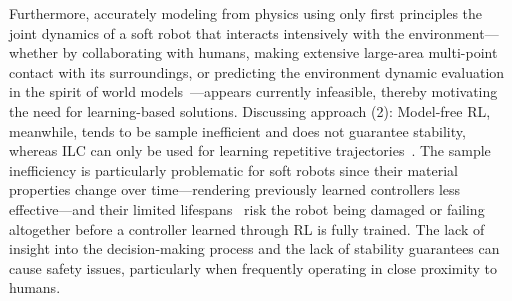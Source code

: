 Furthermore, accurately modeling from physics using only first principles the joint dynamics of a soft robot that interacts intensively with the environment—whether by collaborating with humans, making extensive large-area multi-point contact with its surroundings, or predicting the environment dynamic evaluation in the spirit of world models~\citep{ha2018world}—appears currently infeasible, thereby motivating the need for learning-based solutions.
Discussing approach (2): Model-free \gls{RL}, meanwhile, tends to be sample inefficient and does not guarantee stability, whereas \gls{ILC} can only be used for learning repetitive trajectories~\citep{bristow2006survey}. The sample inefficiency is particularly problematic for soft robots since their material properties change over time—rendering previously learned controllers less effective—and their limited lifespans~\citep{yasa2023overview} risk the robot being damaged or failing altogether before a controller learned through \gls{RL} is fully trained.
The lack of insight into the decision-making process and the lack of stability guarantees can cause safety issues, particularly when frequently operating in close proximity to humans.

